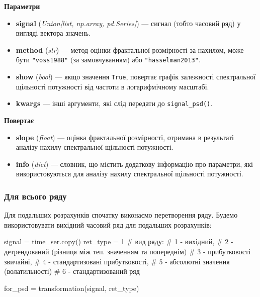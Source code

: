 \documentclass[
  letterpaper,
]{report}
\newenvironment{Shaded}{\begin{snugshade}}{\end{snugshade}}
\newcommand{\CommentTok}[1]{\textcolor[rgb]{0.37,0.37,0.37}{#1}}
\newcommand{\DecValTok}[1]{\textcolor[rgb]{0.68,0.00,0.00}{#1}}
\newcommand{\NormalTok}[1]{\textcolor[rgb]{0.00,0.23,0.31}{#1}}
\newcommand{\OperatorTok}[1]{\textcolor[rgb]{0.37,0.37,0.37}{#1}}
\providecommand{\tightlist}{%
  \setlength{\itemsep}{0pt}\setlength{\parskip}{0pt}}\usepackage{longtable,booktabs,array}
\begin{document}
\textbf{Параметри}

\begin{itemize}
\tightlist
\item
  \textbf{signal} (\emph{Union{[}list, np.array, pd.Series{]}}) ---
  сигнал (тобто часовий ряд) у вигляді вектора значень.
\item
  \textbf{method} (\emph{str}) --- метод оцінки фрактальної розмірності
  за нахилом, може бути \texttt{"voss1988"} (за замовчуванням) або
  \texttt{"hasselman2013"}.
\item
  \textbf{show} (\emph{bool}) --- якщо значення \texttt{True}, повертає
  графік залежності спектральної щільності потужності від частоти в
  логарифмічному масштабі.
\item
  \textbf{kwargs} --- інші аргументи, які слід передати до
  \texttt{signal\_psd()}.
\end{itemize}

\textbf{Повертає}

\begin{itemize}
\tightlist
\item
  \textbf{slope} (\emph{float}) --- оцінка фрактальної розмірності,
  отримана в результаті аналізу нахилу спектральної щільності
  потужності.
\item
  \textbf{info} (\emph{dict}) --- словник, що містить додаткову
  інформацію про параметри, які використовуються для аналізу нахилу
  спектральної щільності потужності.
\end{itemize}

\hypertarget{ux434ux43bux44f-ux432ux441ux44cux43eux433ux43e-ux440ux44fux434ux443-2}{%
\subsubsection{Для всього
ряду}\label{ux434ux43bux44f-ux432ux441ux44cux43eux433ux43e-ux440ux44fux434ux443-2}}

Для подальших розрахунків спочатку виконаємо перетворення ряду. Будемо
використовувати вихідний часовий ряд для подальших розрахунків:

\begin{Shaded}
\begin{Highlighting}[]
\NormalTok{signal }\OperatorTok{=}\NormalTok{ time\_ser.copy()}
\NormalTok{ret\_type }\OperatorTok{=} \DecValTok{1}    \CommentTok{\# вид ряду: }
                \CommentTok{\# 1 {-} вихідний, }
                \CommentTok{\# 2 {-} детрендований (різниця між теп. значенням та попереднім)}
                \CommentTok{\# 3 {-} прибутковості звичайні, }
                \CommentTok{\# 4 {-} стандартизовані прибутковості, }
                \CommentTok{\# 5 {-} абсолютні значення (волатильності)}
                \CommentTok{\# 6 {-} стандартизований ряд}

\NormalTok{for\_psd }\OperatorTok{=}\NormalTok{ transformation(signal, ret\_type) }
\end{Highlighting}
\end{Shaded}
\end{document}
